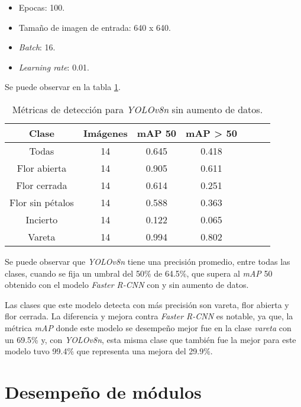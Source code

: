 \begin{itemize}
	\item Epocas: 100.
    \item Tamaño de imagen de entrada: 640 x 640.
    \item \textit{Batch}: 16.
    \item \textit{Learning rate}: 0.01.
\end{itemize}

Se puede observar en la tabla \ref{tab:resultadosYoloSinAug}.

\begin{table}[h]
	\centering
	\caption{Métricas de detección para \textit{YOLOv8n} sin aumento de datos.}
	\begin{tabular}{c c c c c c c}    
		\toprule
		\textbf{Clase}&\textbf{Imágenes}&\textbf{mAP 50}&\textbf{mAP > 50}\\
		\midrule
		Todas & 14 & 0.645 & 0.418\\
		Flor abierta & 14 & 0.905 & 0.611 \\
		Flor cerrada & 14 & 0.614 & 0.251 \\
		Flor sin pétalos & 14 & 0.588 & 0.363 \\
		Incierto & 14 & 0.122 & 0.065 \\
		Vareta & 14 & 0.994 & 0.802 \\		
		\bottomrule
		\hline
	\end{tabular}
	\label{tab:resultadosYoloSinAug}
\end{table}

Se puede observar que \textit{YOLOv8n} tiene una precisión promedio, entre todas las clases, cuando se fija un umbral del 50\% de 64.5\%, que supera al \textit{mAP} 50 obtenido con el modelo \textit{Faster R-CNN} con y sin aumento de datos.

Las clases que este modelo detecta con más precisión son vareta, flor abierta y flor cerrada. La diferencia y mejora contra \textit{Faster R-CNN} es notable, ya que, la métrica \textit{mAP} donde este modelo se desempeño mejor fue en la clase \textit{vareta} con un 69.5\% y, con \textit{YOLOv8n}, esta misma clase que también fue la mejor para este modelo tuvo 99.4\% que representa una mejora del 29.9\%.

\section{Desempeño de módulos}
\label{sec:desempeñoModulos}
